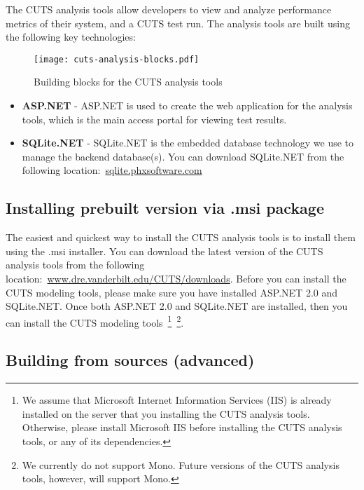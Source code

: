 The CUTS analysis tools allow developers to view and analyze performance metrics
of their system, and a CUTS test run. The analysis tools are built using the 
following key technologies:
\begin{figure}[htbp]
  \centering
  \texttt{[image: cuts-analysis-blocks.pdf]}
  \caption{Building blocks for the CUTS analysis tools}
  \label{fig:cuts-analysis-blocks}
\end{figure}
\begin{itemize}
  \item \textbf{ASP.NET} - ASP.NET is used to create the web application
  for the analysis tools, which is the main access portal for viewing 
  test results.

  \item \textbf{SQLite.NET} - SQLite.NET is the embedded database technology
  we use to manage the backend database(s). You can download SQLite.NET
  from the following location:~\url{sqlite.phxsoftware.com}
\end{itemize}

\subsection{Installing prebuilt version via .msi package}

The easiest and quickest way to install the CUTS analysis tools is to install
them using the .msi installer. You can download the latest version of the
CUTS analysis tools from the following location:~\url{www.dre.vanderbilt.edu/CUTS/downloads}.
Before you can install the CUTS modeling tools, please make sure you have
installed ASP.NET 2.0 and SQLite.NET. Once both ASP.NET 2.0 and SQLite.NET are 
installed, then you can install the CUTS modeling tools~\footnote{We assume that 
Microsoft Internet Information Services (IIS) is already installed on the server
that you installing the CUTS analysis tools. Otherwise, please install Microsoft
IIS before installing the CUTS analysis tools, or any of its dependencies.}~\footnote{We
currently do not support Mono. Future versions of the CUTS analysis tools, however, will
support Mono.}.

\subsection{Building from sources (advanced)}


